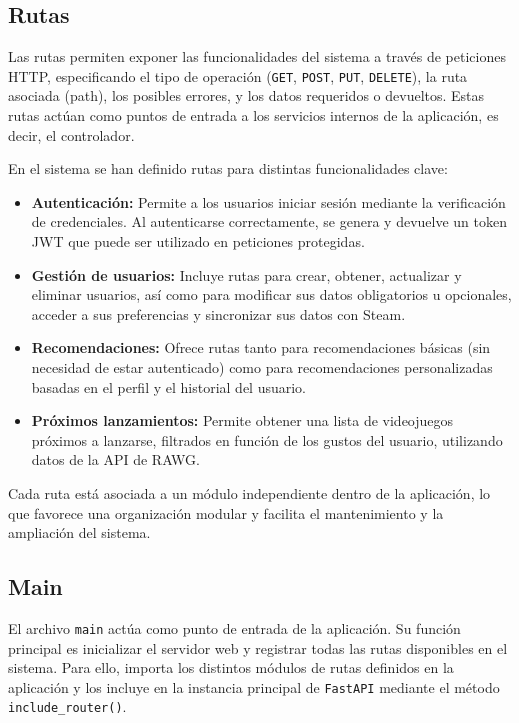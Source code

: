 \subsection{Rutas}

Las rutas permiten exponer las funcionalidades del sistema a través de peticiones HTTP, especificando el tipo de operación (\texttt{GET}, \texttt{POST}, \texttt{PUT}, \texttt{DELETE}), la ruta asociada (path), los posibles errores, y los datos requeridos o devueltos. Estas rutas actúan como puntos de entrada a los servicios internos de la aplicación, es decir, el controlador.

En el sistema se han definido rutas para distintas funcionalidades clave:

\begin{itemize}
	\item \textbf{Autenticación:} Permite a los usuarios iniciar sesión mediante la verificación de credenciales. Al autenticarse correctamente, se genera y devuelve un token JWT que puede ser utilizado en peticiones protegidas.
	
	\item \textbf{Gestión de usuarios:} Incluye rutas para crear, obtener, actualizar y eliminar usuarios, así como para modificar sus datos obligatorios u opcionales, acceder a sus preferencias y sincronizar sus datos con Steam.
	
	\item \textbf{Recomendaciones:} Ofrece rutas tanto para recomendaciones básicas (sin necesidad de estar autenticado) como para recomendaciones personalizadas basadas en el perfil y el historial del usuario.
	
	\item \textbf{Próximos lanzamientos:} Permite obtener una lista de videojuegos próximos a lanzarse, filtrados en función de los gustos del usuario, utilizando datos de la API de RAWG.
\end{itemize}

Cada ruta está asociada a un módulo independiente dentro de la aplicación, lo que favorece una organización modular y facilita el mantenimiento y la ampliación del sistema.

\subsection{Main}

El archivo \texttt{main} actúa como punto de entrada de la aplicación. Su función principal es inicializar el servidor web y registrar todas las rutas disponibles en el sistema. Para ello, importa los distintos módulos de rutas definidos en la aplicación y los incluye en la instancia principal de \texttt{FastAPI} mediante el método \texttt{include\_router()}.

